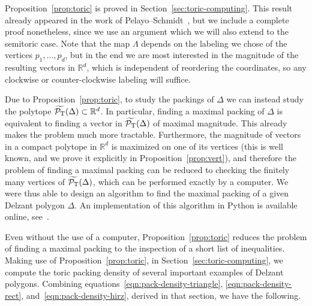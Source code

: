 \documentclass[10pt,a4paper]{amsart}
\numberwithin{equation}{section}
\def\R{{\mathbb R}}
\newcommand{\De}{\Delta}
\newcommand{\PT}{\mathcal{P}_{\rm T}}
\newcommand{\PTtilde}{\widetilde{\PT}}
\theoremstyle{definition}
\theoremstyle{plain}
\theoremstyle{plain}
\begin{document}
Proposition~\ref{prop:toric} is proved in Section~\ref{sec:toric-computing}.
This result already appeared in the work of Pelayo--Schmidt~\cite{PeSc2008}, but we include a complete proof nonetheless, since we use an argument which we will also extend to the semitoric case.
Note that the map $\Lambda$ depends on the labeling we chose of the vertices $p_1,\ldots, p_d$, but in the end we are most interested in the magnitude of the resulting vectors in $\R^d$, which is independent of reordering the coordinates, so any clockwise or counter-clockwise labeling will suffice.


Due to Proposition~\ref{prop:toric}, to study the packings of $\De$ we can instead study the polytope ${\PTtilde(\Delta)\subset\R^d}$.
In particular, finding a maximal packing of $\De$ is equivalent to finding a vector in $\PTtilde(\Delta)$ of maximal magnitude.
This already makes the problem much more tractable.
Furthermore, the magnitude of vectors in a compact polytope in $\R^d$ is maximized on one of its vertices (this is well known, and we prove it explicitly in Proposition~\ref{prop:vert}), and therefore the problem of finding a maximal packing can be reduced to checking the finitely many vertices of $\PTtilde(\De)$, which can be performed exactly by a computer.
We were thus able to design an algorithm to find the maximal packing of a given Delzant polygon $\Delta$.
An implementation of this algorithm in Python is available online, see~\cite{alg-url}.

Even without the use of a computer, Proposition~\ref{prop:toric} reduces the problem of finding a maximal packing to the inspection of a short list of inequalities.
Making use of Proposition~\ref{prop:toric}, in Section~\ref{sec:toric-computing}, we compute the toric packing density of several important examples of Delzant polygons.
Combining equations~\eqref{eqn:pack-density-triangle}, \eqref{eqn:pack-density-rect}, and~\eqref{eqn:pack-density-hirz}, derived in that section, we have the following.
\end{document}
